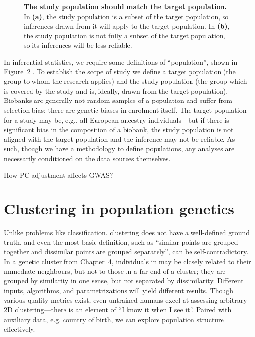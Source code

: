\begin{figure}[ht]
\begin{subfigure}{0.45\linewidth}
    \caption{}
    \label{fig:statistical_populations2}
\end{subfigure}
\caption[The relationship between target and study populations]{\textbf{The study population should match the target population.} In \textbf{(a)}, the study population is a subset of the target population, so inferences drawn from it will apply to the target population. In \textbf{(b)}, the study population is not fully a subset of the target population, so its inferences will be less reliable.}
\label{fig:statistical_populations}
\end{figure}

In inferential statistics, we require some definitions of ``population'', shown in Figure~\ref{fig:statistical_populations} . To establish the scope of study we define a target population (the group to whom the research applies) and the study population (the group which is covered by the study and is, ideally, drawn from the target population)\citep{statcan2003}. Biobanks are generally not random samples of a population and suffer from selection bias\citep{huang_representativeness_2021}; there are genetic biases in enrolment itself\citep{pirastu_genetic_2021,benonisdottir_studying_2023}. The target population for a study may be, e.g., all European-ancestry individuals---but if there is significant bias in the composition of a biobank, the study population is not aligned with the target population and the inference may not be reliable. As such, though we have a methodology to define populations, any analyses are necessarily conditioned on the data sources themselves.

How PC adjustment affects GWAS?

\section{Clustering in population genetics}

Unlike problems like classification, clustering does not have a well-defined ground truth, and even the most basic definition, such as ``similar points are grouped together and dissimilar points are grouped separately'', can be self-contradictory\citep{ben-david_clustering_2018}. In a genetic cluster from \hyperref[chap:chapter4]{Chapter~4}, individuals in may be closely related to their immediate neighbours, but not to those in a far end of a cluster; they are grouped by similarity in one sense, but not separated by dissimilarity. Different inputs, algorithms, and parametrizations will yield different results. Though various quality metrics exist, even untrained humans excel at assessing arbitrary $2$D clustering\citep{lewis_human_2012}---there is an element of ``I know it when I see it''. Paired with auxiliary data, e.g. country of birth, we can explore population structure effectively.

